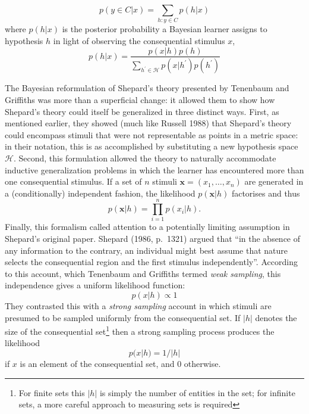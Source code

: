 \documentclass[english,doc]{apa6}
\begin{document}
\begin{equation}
p(y \in C | x) = \sum_{h : y \in C} p(h|x)
\end{equation}
\noindent
where \(p(h|x)\) is the posterior probability a Bayesian learner assigns to hypothesis \(h\) in light of observing the consequential stimulus \(x\),
\begin{equation}
p(h|x) = \frac{p(x|h)p(h)}{\sum_{h^\prime \in \mathcal{H}} p(x | h^\prime) p(h^\prime)}
\end{equation}

The Bayesian reformulation of Shepard's theory presented by Tenenbaum and Griffiths was more than a superficial change: it allowed them to show how Shepard's theory could itself be generalized in three distinct ways. First, as mentioned earlier, they showed (much like Russell 1988) that Shepard's theory could encompass stimuli that were not representable as points in a metric space: in their notation, this is as accomplished by substituting a new hypothesis space \(\mathcal{H}\). Second, this formulation allowed the theory to naturally accommodate inductive generalization problems in which the learner has encountered more than one consequential stimulus. If a set of \(n\) stimuli \(\mathbf{x} = (x_1, \ldots, x_n)\) are generated in a (conditionally) independent fashion, the likelihood \(p(\mathbf{x}|h)\) factorises and thus
\begin{equation}
p(\mathbf{x}|h) = \prod_{i=1}^n p(x_i |h).
\end{equation}
Finally, this formalism called attention to a potentially limiting assumption in Shepard's original paper. Shepard (1986, p.~1321) argued that ``in the absence of any information to the contrary, an individual might best assume that nature selects the consequential region and the first stimulus independently''. According to this account, which Tenenbaum and Griffiths termed \emph{weak sampling}, this independence gives a uniform likelihood function:
\begin{equation}
p(x|h) \propto 1
\end{equation}
They contrasted this with a \emph{strong sampling} account in which stimuli are presumed to be sampled uniformly from the consequential set. If \(|h|\) denotes the size of the consequential set\footnote{For finite sets this \(|h|\) is simply the number of entities in the set; for infinite sets, a more careful approach to measuring sets is required} then a strong sampling process produces the likelihood
\begin{equation}
p(x|h) = 1/|h|
\end{equation}
if \(x\) is an element of the consequential set, and 0 otherwise.
\end{document}
